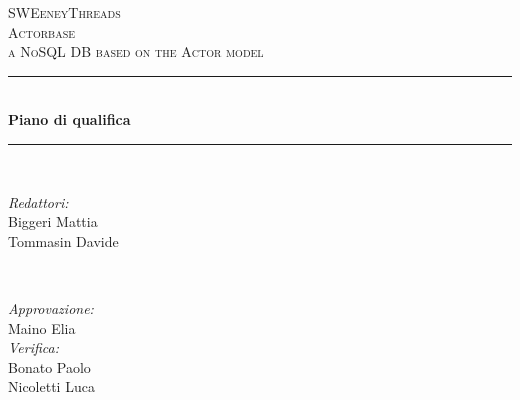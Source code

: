 \documentclass[a4paper]{article}
\begin{document}
	\begin{titlepage}
		\newcommand{\HRule}{\rule{\linewidth}{0.5mm}} 
		\center  
		
		\textsc{\LARGE SWEeneyThreads}\\[1.5cm] 
		\textsc{\Large Actorbase}\\[0.5cm] 
		\textsc{\large a NoSQL DB based on the Actor model}\\[0.5cm]
		
		
		\HRule \\[0.4cm]
		{ \huge \bfseries Piano di qualifica}\\[0.4cm] 
		\HRule \\[1.5cm]
		
		\begin{minipage}{0.4\textwidth}
			\begin{flushleft} \large
				\emph{Redattori:}\\
				Biggeri Mattia\\
				Tommasin Davide\\
			\end{flushleft}
		\end{minipage}
		~
		\begin{minipage}{0.4\textwidth}
			\begin{flushright} \large
				\emph{Approvazione:} \\
                Maino Elia \\
				\emph{Verifica:} \\
				Bonato Paolo \\
                Nicoletti Luca \\
			\end{flushright}
		\end{minipage}
		

\end{titlepage}
\end{document}
